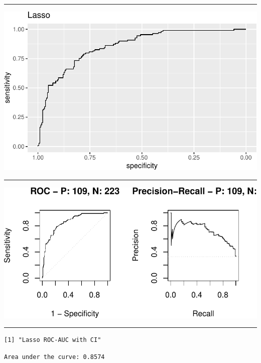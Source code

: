 \documentclass[
  letterpaper,
  DIV=11,
  numbers=noendperiod]{scrartcl}
\begin{document}
\begin{center}\rule{0.5\linewidth}{0.5pt}\end{center}

\footnotesize

\includegraphics{L17v2_files/figure-pdf/unnamed-chunk-14-1.pdf}

\begin{center}\rule{0.5\linewidth}{0.5pt}\end{center}

\includegraphics{L17v2_files/figure-pdf/unnamed-chunk-15-1.pdf}

\begin{center}\rule{0.5\linewidth}{0.5pt}\end{center}

\footnotesize

\begin{verbatim}
[1] "Lasso ROC-AUC with CI"
\end{verbatim}

\begin{verbatim}
Area under the curve: 0.8574
\end{verbatim}
\end{document}
